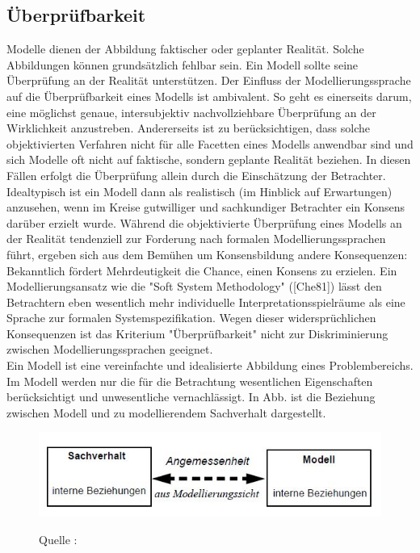 \subsection{Überprüfbarkeit}
Modelle dienen der Abbildung faktischer oder geplanter Realität. Solche Abbildungen können grundsätzlich
fehlbar sein. Ein Modell sollte seine Überprüfung an der Realität unterstützen. Der Einfluss der
Modellierungssprache auf die Überprüfbarkeit eines Modells ist ambivalent. So geht es einerseits
darum, eine möglichst genaue, intersubjektiv nachvollziehbare Überprüfung an der Wirklichkeit anzustreben.
Andererseits ist zu berücksichtigen, dass solche objektivierten Verfahren nicht für alle Facetten
eines Modells anwendbar sind und sich Modelle oft nicht auf faktische, sondern geplante Realität
beziehen. In diesen Fällen erfolgt die Überprüfung allein durch die Einschätzung der Betrachter. Idealtypisch
ist ein Modell dann als realistisch (im Hinblick auf Erwartungen) anzusehen, wenn im Kreise
gutwilliger und sachkundiger Betrachter ein Konsens darüber erzielt wurde. Während die objektivierte
Überprüfung eines Modells an der Realität tendenziell zur Forderung nach formalen Modellierungssprachen
führt, ergeben sich aus dem Bemühen um Konsensbildung andere Konsequenzen: Bekanntlich
fördert Mehrdeutigkeit die Chance, einen Konsens zu erzielen. Ein Modellierungsansatz wie die
"Soft System Methodology" ([Che81]) lässt den Betrachtern eben wesentlich mehr individuelle Interpretationsspielräume
als eine Sprache zur formalen Systemspezifikation. Wegen dieser widersprüchlichen
Konsequenzen ist das Kriterium "Überprüfbarkeit" nicht zur Diskriminierung zwischen Modellierungssprachen
geeignet.\\
Ein Modell ist eine vereinfachte und idealisierte Abbildung eines Problembereichs. Im Modell werden
nur die für die Betrachtung wesentlichen Eigenschaften berücksichtigt und unwesentliche vernachlässigt.
In Abb.  ist die Beziehung zwischen Modell und zu modellierendem Sachverhalt dargestellt.\cite{MT010}
\begin{center}
	\begin{figure}[h]
		
		
		\includegraphics[scale=1]{Graphics/Sachverhalt.jpg}
		
		
		
		Quelle : \cite{MT010}
		
		
		
		\label{fig9}
		
		
	\end{figure}
	
\end{center}

